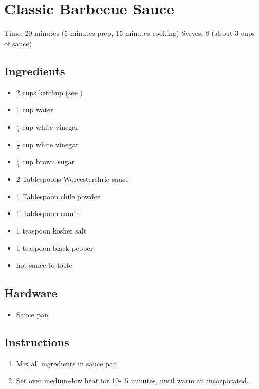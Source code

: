 \section{Classic Barbecue Sauce}
\label{classicBarbecueSauce}
\setcounter{secnumdepth}{0}
Time: 20 minutes (5 minutes prep, 15 minutes cooking)
Serves: 8 (about 3 cups of sauce)

\begin{multicols}{2}
\subsection*{Ingredients}
\begin{itemize}
    \item 2 cups ketchup (see )
    \item 1 cup water
    \item \( \frac{1}{4} \) cup white vinegar
    \item \( \frac{1}{4} \) cup white vinegar
    \item \( \frac{1}{4} \) cup brown sugar
    \item 2 Tablespoons Worcestershrie sauce
    \item 1 Tablespoon chile powder
    \item 1 Tablespoon cumin
    \item 1 teaspoon kosher salt
    \item 1 teaspoon black pepper
    \item hot sauce to taste

\end{itemize}

\subsection*{Hardware}
\begin{itemize}
    \item Sauce pan
\end{itemize}
\clearpage

\subsection*{Instructions}
\begin{enumerate}
    \item Mix all ingredients in sauce pan.
    \item Set over medium-low heat for 10-15 minutes, until warm an incorporated.

\end{enumerate}


\end{multicols}
